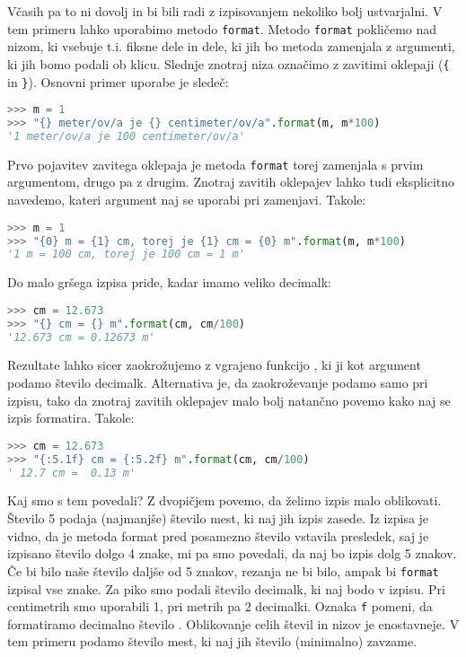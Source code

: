 Včasih pa to ni dovolj in bi bili radi z izpisovanjem nekoliko bolj ustvarjalni. V tem primeru lahko uporabimo metodo \texttt{format}. Metodo \texttt{format} pokličemo nad nizom, ki vsebuje t.i. fiksne dele in dele, ki jih bo metoda zamenjala z argumenti, ki jih bomo podali ob klicu. Slednje znotraj niza označimo z zavitimi oklepaji (\texttt{\{} in \texttt{\}}). Osnovni primer uporabe je sledeč:
\begin{lstlisting}[language=Python]
>>> m = 1
>>> "{} meter/ov/a je {} centimeter/ov/a".format(m, m*100)
'1 meter/ov/a je 100 centimeter/ov/a'
\end{lstlisting}
Prvo pojavitev zavitega oklepaja je metoda \texttt{format} torej zamenjala s prvim argumentom, drugo pa z drugim. Znotraj zavitih oklepajev lahko tudi eksplicitno navedemo, kateri argument naj se uporabi pri zamenjavi. Takole:
\begin{lstlisting}[language=Python]
>>> m = 1
>>> "{0} m = {1} cm, torej je {1} cm = {0} m".format(m, m*100)
'1 m = 100 cm, torej je 100 cm = 1 m'
\end{lstlisting}
Do malo gršega izpisa pride, kadar imamo veliko decimalk:
\begin{lstlisting}[language=Python]
>>> cm = 12.673
>>> "{} cm = {} m".format(cm, cm/100)
'12.673 cm = 0.12673 m'
\end{lstlisting}
Rezultate lahko sicer zaokrožujemo z vgrajeno funkcijo , ki ji kot argument podamo število decimalk. Alternativa je, da zaokroževanje podamo samo pri izpisu, tako da znotraj zavitih oklepajev malo bolj natančno povemo kako naj se izpis formatira. Takole:
\begin{lstlisting}[language=Python]
>>> cm = 12.673
>>> "{:5.1f} cm = {:5.2f} m".format(cm, cm/100)
' 12.7 cm =  0.13 m'
\end{lstlisting}
Kaj smo s tem povedali? Z dvopičjem povemo, da želimo izpis malo oblikovati. Število 5 podaja (najmanjše) število mest, ki naj jih izpis zasede. Iz izpisa je vidno, da je metoda format pred posamezno število vstavila presledek, saj je izpisano število dolgo 4 znake, mi pa smo povedali, da naj bo izpis dolg 5 znakov. Če bi bilo naše število daljše od 5 znakov, rezanja ne bi bilo, ampak bi \texttt{format} izpisal vse znake. Za piko smo podali število decimalk, ki naj bodo v izpisu. Pri centimetrih smo uporabili 1, pri metrih pa 2 decimalki. Oznaka \texttt{f} pomeni, da formatiramo decimalno število . Oblikovanje celih števil in nizov je enostavneje. V tem primeru podamo število mest, ki naj jih število (minimalno) zavzame. 
